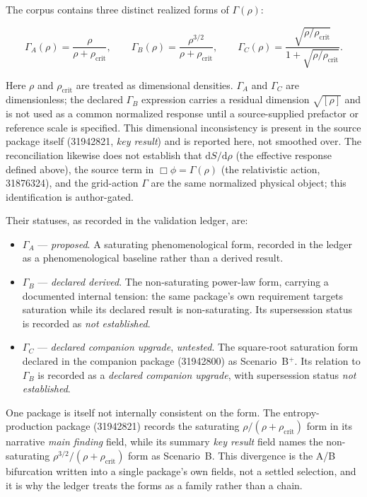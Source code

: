 \documentclass[11pt,a4paper]{article}
\begin{document}
The corpus contains three distinct realized forms of $\Gamma(\rho)$:

\begin{equation}
\Gamma_{A}(\rho) = \frac{\rho}{\rho + \rho_{\mathrm{crit}}},
\qquad
\Gamma_{B}(\rho) = \frac{\rho^{3/2}}{\rho + \rho_{\mathrm{crit}}},
\qquad
\Gamma_{C}(\rho) = \frac{\sqrt{\rho/\rho_{\mathrm{crit}}}}{1 + \sqrt{\rho/\rho_{\mathrm{crit}}}}.
\end{equation}

Here $\rho$ and $\rho_{\mathrm{crit}}$ are treated as dimensional densities. $\Gamma_{A}$ and $\Gamma_{C}$ are dimensionless; the declared $\Gamma_{B}$ expression carries a residual dimension $\sqrt{[\rho]}$ and is not used as a common normalized response until a source-supplied prefactor or reference scale is specified. This dimensional inconsistency is present in the source package itself (31942821, \emph{key result}) and is reported here, not smoothed over. The reconciliation likewise does not establish that $\mathrm{d}S/\mathrm{d}\rho$ (the effective response defined above), the source term in $\Box\phi = \Gamma(\rho)$ (the relativistic action, 31876324), and the grid-action $\Gamma$ are the same normalized physical object; this identification is author-gated.

Their statuses, as recorded in the validation ledger, are:

\begin{itemize}
\item $\Gamma_{A}$ --- \emph{proposed}. A saturating phenomenological form, recorded in the ledger as a phenomenological baseline rather than a derived result.
\item $\Gamma_{B}$ --- \emph{declared derived}. The non-saturating power-law form, carrying a documented internal tension: the same package's own requirement targets saturation while its declared result is non-saturating. Its supersession status is recorded as \emph{not established}.
\item $\Gamma_{C}$ --- \emph{declared companion upgrade}, \emph{untested}. The square-root saturation form declared in the companion package (31942800) as Scenario~B$^{+}$. Its relation to $\Gamma_{B}$ is recorded as a \emph{declared companion upgrade}, with supersession status \emph{not established}.
\end{itemize}

One package is itself not internally consistent on the form. The entropy-production package (31942821) records the saturating $\rho/(\rho+\rho_{\mathrm{crit}})$ form in its narrative \emph{main finding} field, while its summary \emph{key result} field names the non-saturating $\rho^{3/2}/(\rho+\rho_{\mathrm{crit}})$ form as Scenario~B. This divergence is the A/B bifurcation written into a single package's own fields, not a settled selection, and it is why the ledger treats the forms as a family rather than a chain.
\end{document}
